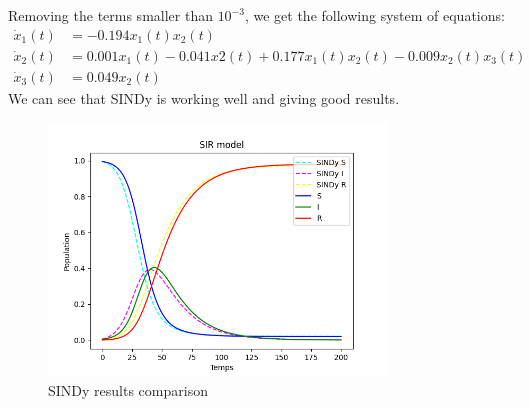 \documentclass{article}
\begin{document}
Removing the terms smaller than $10^{-3}$, we get the following system of equations:
\begin{align*}
\dot{x}_1(t) &= -0.194x_1(t)x_2(t) \\
\dot{x}_2(t) &= 0.001x_1(t) -0.041x2(t) + 0.177x_1(t)x_2(t) -0.009x_2(t)x_3(t) \\
\dot{x}_3(t) &= 0.049x_2(t)
\end{align*}
We can see that SINDy is working well and giving good results.
\begin{figure}[h]
\centering 
\includegraphics[width=0.8\textwidth]{images/SIR.png}
\caption{SINDy results comparison}
\label{fig:SIR}
\end{figure}
\end{document}
